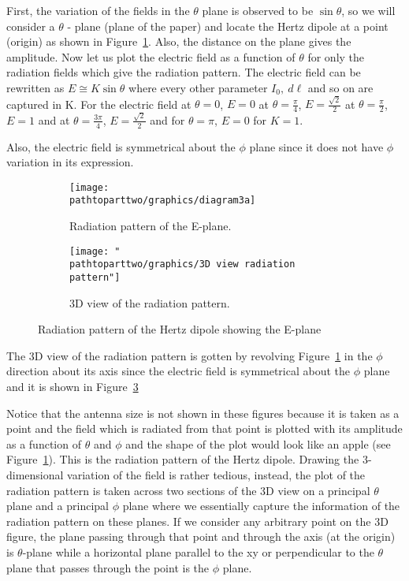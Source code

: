First, the variation of the fields in the $\theta$ plane is observed to be $\sin\theta$, so we will consider a $\theta$ - plane (plane of the paper) and locate the Hertz dipole at a point (origin) as shown in Figure~\ref{fig:thetaplane}. Also, the distance on the plane gives the amplitude. Now let us plot the electric field as a function of $\theta$ for only the radiation fields which give the radiation pattern. The electric field can be rewritten as $E \cong K\sin\theta$ where every other parameter $I_0, \ d\ell$ and so on are captured in K. For the electric field at $\theta = 0$, $E=0$ at $\theta=\frac{\pi}{4}$, $E=\frac{\sqrt{2}}{2}$ at $\theta=\frac{\pi}{2}$, $E=1$ and at $\theta=\frac{3\pi}{4}$, $E=\frac{\sqrt{2}}{2}$ and for $\theta=\pi$, $E=0$ for $K=1$.

Also, the electric field is symmetrical about the $\phi$ plane since it does not have $\phi$ variation in its expression. 
\begin{figure}[h]
\centering
\begin{subfigure}[a]{0.8\linewidth}
\texttt{[image: \\pathtoparttwo/graphics/diagram3a]}
\caption{Radiation pattern of the E-plane.}
\label{fig:thetaplane}
\end{subfigure}
\hfill
\begin{subfigure}[b]{0.8\linewidth}
\texttt{[image: "\\pathtoparttwo/graphics/3D view radiation pattern"]}
\caption{3D view of the radiation pattern.}
\label{fig:3dview}
\end{subfigure}
\caption{Radiation pattern of the Hertz dipole showing the E-plane}
\end{figure}

The 3D view of the radiation pattern is gotten by revolving Figure~\ref{fig:thetaplane} in the $\phi$ direction about its axis since the electric field is symmetrical about the $\phi$ plane and it is shown in Figure~\ref{fig:3dview}

Notice that the antenna size is not shown in these figures because it is taken as a point and the field which is radiated from that point is plotted with its amplitude as a function of $\theta$ and $\phi$ and the shape of the plot would look like an apple (see Figure~\ref{fig:thetaplane}). This is the radiation pattern of the Hertz dipole. Drawing the 3-dimensional variation of the field is rather tedious, instead, the plot of the radiation pattern is taken across two sections of the 3D view on a principal $\theta$ plane and a principal $\phi$ plane where we essentially capture the information of the radiation pattern on these planes. If we consider any arbitrary point on the 3D figure, the plane passing through that point and through the axis (at the origin) is $\theta$-plane while a horizontal plane parallel to the xy or perpendicular to the $\theta$ plane that passes through the point is the $\phi$ plane.

